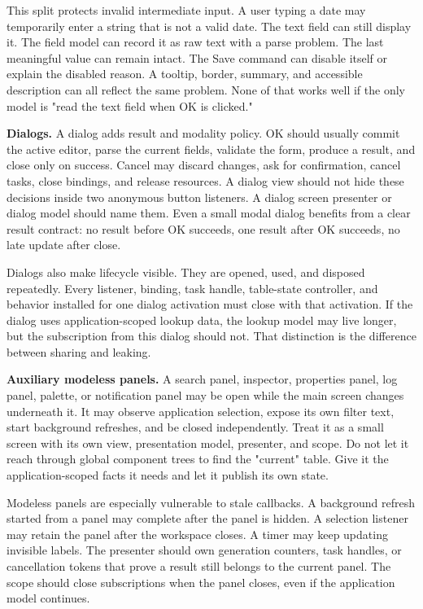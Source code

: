 This split protects invalid intermediate input. A user typing a date may temporarily enter a string that is not a valid date. The text field can still display it. The field model can record it as raw text with a parse problem. The last meaningful value can remain intact. The Save command can disable itself or explain the disabled reason. A tooltip, border, summary, and accessible description can all reflect the same problem. None of that works well if the only model is "read the text field when OK is clicked."

\textbf{Dialogs.} A dialog adds result and modality policy. OK should usually commit the active editor, parse the current fields, validate the form, produce a result, and close only on success. Cancel may discard changes, ask for confirmation, cancel tasks, close bindings, and release resources. A dialog view should not hide these decisions inside two anonymous button listeners. A dialog screen presenter or dialog model should name them. Even a small modal dialog benefits from a clear result contract: no result before OK succeeds, one result after OK succeeds, no late update after close.

Dialogs also make lifecycle visible. They are opened, used, and disposed repeatedly. Every listener, binding, task handle, table-state controller, and behavior installed for one dialog activation must close with that activation. If the dialog uses application-scoped lookup data, the lookup model may live longer, but the subscription from this dialog should not. That distinction is the difference between sharing and leaking.

\textbf{Auxiliary modeless panels.} A search panel, inspector, properties panel, log panel, palette, or notification panel may be open while the main screen changes underneath it. It may observe application selection, expose its own filter text, start background refreshes, and be closed independently. Treat it as a small screen with its own view, presentation model, presenter, and scope. Do not let it reach through global component trees to find the "current" table. Give it the application-scoped facts it needs and let it publish its own state.

Modeless panels are especially vulnerable to stale callbacks. A background refresh started from a panel may complete after the panel is hidden. A selection listener may retain the panel after the workspace closes. A timer may keep updating invisible labels. The presenter should own generation counters, task handles, or cancellation tokens that prove a result still belongs to the current panel. The scope should close subscriptions when the panel closes, even if the application model continues.

